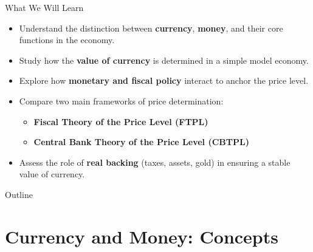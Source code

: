 \documentclass[11pt,aspectratio=169]{beamer}
\begin{document}
\begin{frame}{What We Will Learn}

\begin{itemize}
  \item Understand the distinction between \textbf{currency}, \textbf{money}, and their core functions in the economy.
  
  \vspace{0.2cm}
  \item Study how the \textbf{value of currency} is determined in a simple model economy.
  
  \vspace{0.2cm}
  \item Explore how \textbf{monetary and fiscal policy} interact to anchor the price level.
  
  \vspace{0.2cm}
  \item Compare two main frameworks of price determination:
  \begin{itemize}
      \item \textbf{Fiscal Theory of the Price Level (FTPL)}  
      \item \textbf{Central Bank Theory of the Price Level (CBTPL)}
  \end{itemize}
  
  \vspace{0.2cm}
  \item Assess the role of \textbf{real backing} (taxes, assets, gold) in ensuring a stable value of currency.
\end{itemize}
\end{frame}


\begin{frame}{Outline}
\tableofcontents
\end{frame}

\section{Currency and Money: Concepts}
\end{document}
